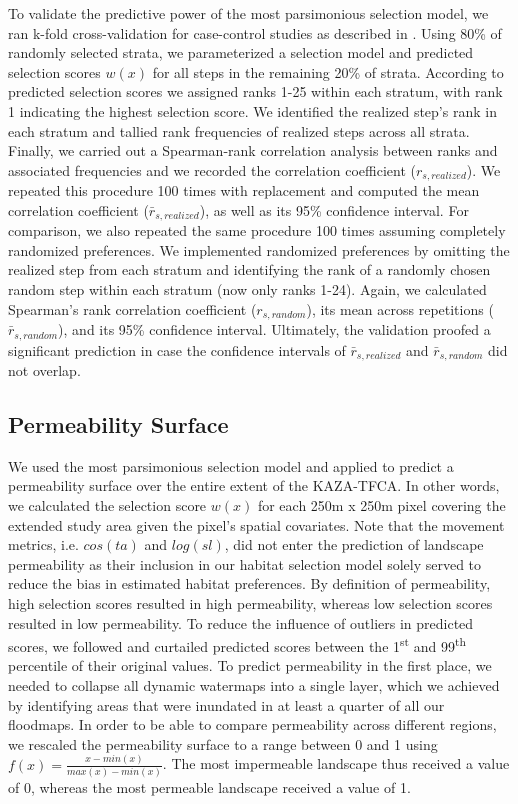 \documentclass[abstract=on,10pt,a4paper,bibliography=totocnumbered]{scrartcl}
\begin{document}
To validate the predictive power of the most parsimonious selection model, we
ran k-fold cross-validation for case-control studies as described in
\cite{Fortin.2009}. Using 80\% of randomly selected strata, we parameterized a
selection model and predicted selection scores \(w(x)\) for all steps in the
remaining 20\% of strata. According to predicted selection scores we assigned
ranks 1-25 within each stratum, with rank 1 indicating the highest selection
score. We identified the realized step's rank in each stratum and tallied rank
frequencies of realized steps across all strata. Finally, we carried out a
Spearman-rank correlation analysis between ranks and associated frequencies and
we recorded the correlation coefficient (\(r_{s, realized}\)). We repeated this
procedure 100 times with replacement and computed the mean correlation
coefficient (\(\bar{r}_{s, realized}\)), as well as its 95\% confidence
interval. For comparison, we also repeated the same procedure 100 times assuming
completely randomized preferences. We implemented randomized preferences by
omitting the realized step from each stratum and identifying the rank of a
randomly chosen random step within each stratum (now only ranks 1-24). Again, we
calculated Spearman's rank correlation coefficient (\(r_{s, random}\)), its mean
across repetitions (\(\bar{r}_{s, random}\)), and its 95\% confidence interval.
Ultimately, the validation proofed a significant prediction in case the
confidence intervals of \(\bar{r}_{s, realized}\) and \(\bar{r}_{s, random}\)
did not overlap.

\subsection{Permeability Surface}
We used the most parsimonious selection model and applied  to predict
a permeability surface over the entire extent of the KAZA-TFCA. In other words,
we calculated the selection score \(w(x)\) for each 250m x 250m pixel covering
the extended study area given the pixel's spatial covariates. Note that the
movement metrics, i.e. \(cos(ta)\) and \(log(sl)\), did not enter the prediction
of landscape permeability as their inclusion in our habitat selection model
solely served to reduce the bias in estimated habitat preferences. By definition
of permeability, high selection scores resulted in high permeability, whereas
low selection scores resulted in low permeability. To reduce the influence of
outliers in predicted scores, we followed \cite{Squires.2013} and curtailed
predicted scores between the 1\textsuperscript{st} and 99\textsuperscript{th}
percentile of their original values. To predict permeability in the first place,
we needed to collapse all dynamic watermaps into a single layer, which we
achieved by identifying areas that were inundated in at least a quarter of all
our floodmaps. In order to be able to compare permeability across different
regions, we rescaled the permeability surface to a range between 0 and 1 using
\(f(x) = \frac{x - min(x)}{max(x) - min(x)}\). The most impermeable landscape
thus received a value of 0, whereas the most permeable landscape received a
value of 1.
\end{document}
